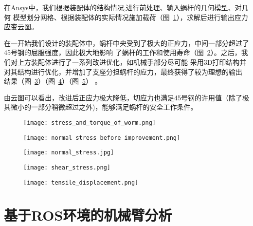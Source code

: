 {  {\songti 在Ansys中，我们根据装配体的结构情况,进行前处理、输入蜗杆的几何模型、对几何
  模型划分网格、根据装配体的实际情况施加载荷（图~\ref{fig:蜗杆的应力与扭矩}），求解后进行输出应力应变云图。}

  {\songti 在一开始我们设计的装配体中，蜗杆中央受到了极大的正应力，中间一部分超过了45号钢的屈服强度，因此极大地影响
  了蜗杆的工作和使用寿命（图~\ref{fig:改进前正应力}）。之后，我们对上方装配体进行了一系列改进优化，如机械手部分尽可能
  采用3D打印结构并对其结构进行优化，并增加了支座分担蜗杆的应力，最终获得了较为理想的输出
  结果（图~\ref{fig:正应力}）（图~\ref{fig:切应力}）（图~\ref{fig:拉伸位移}）} 。
   
  {\songti 由云图可以看出，改进后正应力极大降低，切应力也满足45号钢的许用值（除了极其微小的一部分稍微超过之外)，能够满足蜗杆的安全工作条件。}
 
   

  \begin{figure}[!htp]
    \centering
    \texttt{[image: stress\_and\_torque\_of\_worm.png]}
    \label{fig:蜗杆的应力与扭矩}
  \end{figure}

  
  \begin{figure}[!htp]
    \centering
    \texttt{[image: normal\_stress\_before\_improvement.png]}
    \label{fig:改进前正应力}
  \end{figure}

  
  \begin{figure}[!htp]
    \centering
    \texttt{[image: normal\_stress.jpg]}
    \label{fig:正应力}
  \end{figure}

  \begin{figure}[!htp]
    \centering
    \texttt{[image: shear\_stress.png]}
    \label{fig:切应力}
  \end{figure}

  \begin{figure}[!htp]
    \centering
    \texttt{[image: tensile\_displacement.png]}
    \label{fig:拉伸位移}
  \end{figure}

  \newpage

\section{基于ROS环境的机械臂分析}

}
